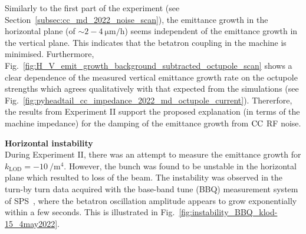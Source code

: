 Similarly to the first part of the experiment (see Section~\ref{subsec:cc_md_2022_noise_scan}), the emittance growth in the horizontal plane (of $\sim 2-4 \ \mathrm{\mu m/h}$) seems independent of the emittance growth in the vertical plane. This indicates that the betatron coupling in the machine is minimised. Furthermore, Fig.~\ref{fig:H_V_emit_growth_background_subtracted_octupole_scan} shows a clear dependence of the measured vertical emittance growth rate on the octupole strengths which agrees qualitatively with that expected from the simulations (see Fig.~\ref{fig:pyheadtail_cc_impedance_2022_md_octupole_current}). Thererfore, the results from Experiment II support the proposed explanation (in terms of the machine impedance) for the damping of the emittance growth from ${\mathrm{CC}}$ RF noise.

\textbf{Horizontal instability}\\
During Experiment II, there was an attempt to measure the emittance growth for $k_\mathrm{LOD}=-10 \ \mathrm{/m^4}$. However, the bunch was found to be unstable in the horizontal plane which resulted to loss of the beam. The instability was observed in the turn-by turn data acquired with the base-band tune (BBQ) measurement system of SPS~\cite{Boccardi:1055568}, where the betatron oscillation amplitude appears to grow exponentially within a few seconds. This is illustrated in Fig.~\ref{fig:instability_BBQ_klod-15_4may2022}.






